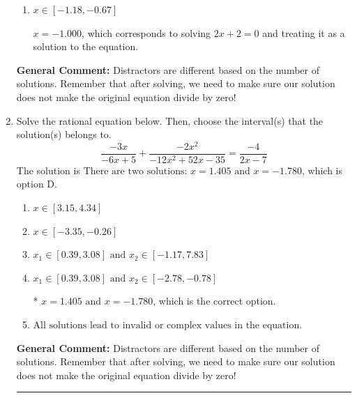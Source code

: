 \documentclass{extbook}[14pt]
\newcommand{\litem}[1]{\item #1

\rule{\textwidth}{0.4pt}}
\begin{document}
\begin{enumerate}
{\begin{enumerate}[label=\Alph*.]
$x = -1.000 \text{ and } x = -0.500$, which corresponds to solving $2x + 2 = 0$ and $-6x -3 = 0$ and treating them as solutions to the equation.
\item \( x \in [-1.18,-0.67] \)

$x = -1.000$, which corresponds to solving $2x + 2 = 0$ and treating it as a solution to the equation.
\end{enumerate}

\textbf{General Comment:} Distractors are different based on the number of solutions. Remember that after solving, we need to make sure our solution does not make the original equation divide by zero!
}
\litem{
Solve the rational equation below. Then, choose the interval(s) that the solution(s) belongs to.
\[ \frac{-3x}{-6x + 5} + \frac{-2x^{2}}{-12x^{2} +52 x -35} = \frac{-4}{2x -7} \]The solution is \( \text{There are two solutions: } x = 1.405 \text{ and } x = -1.780 \), which is option D.\begin{enumerate}[label=\Alph*.]
\item \( x \in [3.15,4.34] \)


\item \( x \in [-3.35,-0.26] \)


\item \( x_1 \in [0.39, 3.08] \text{ and } x_2 \in [-1.17,7.83] \)


\item \( x_1 \in [0.39, 3.08] \text{ and } x_2 \in [-2.78,-0.78] \)

* $x = 1.405 \text{ and } x = -1.780$, which is the correct option.
\item \( \text{All solutions lead to invalid or complex values in the equation.} \)


\end{enumerate}

\textbf{General Comment:} Distractors are different based on the number of solutions. Remember that after solving, we need to make sure our solution does not make the original equation divide by zero!
}
\end{enumerate}
\end{document}

